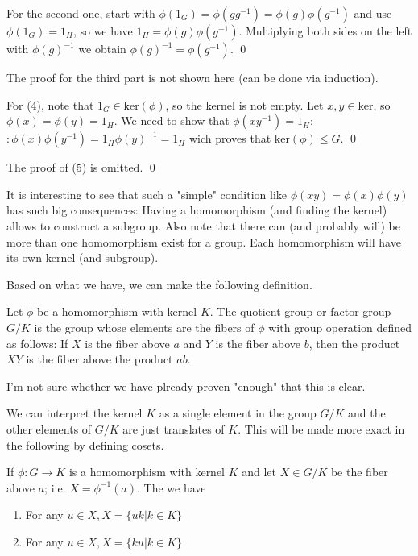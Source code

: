 For the second one, start with $\phi(1_G) = \phi(gg^{-1}) = \phi(g) \phi(g^{-1})$ and use $\phi(1_G) = 1_H$, so we have $1_H = \phi(g) \phi(g^{-1})$. Multiplying both sides on the left with $\phi(g)^{-1}$ we obtain $\phi(g)^{-1} = \phi(g^{-1})$. \qed

The proof for the third part is not shown here (can be done via induction).

For (4), note that $1_G \in \text{ker}(\phi)$, so the kernel is not empty. Let $x,y \in \text{ker}$, so $\phi(x) = \phi(y) = 1_H$. We need to show that $\phi(xy^{-1}) = 1_H$: $:\phi(x)\phi(y^{-1}) = 1_H \phi(y)^{-1} = 1_H$ wich proves that $\text{ker}(\phi) \leq G$. \qed

The proof of (5) is omitted. \qed

It is interesting to see that such a "simple" condition like $\phi(x y) = \phi(x) \phi(y)$ has such big consequences: Having a homomorphism (and finding the kernel) allows to construct a subgroup. Also note that there can (and probably will) be more than one homomorphism exist for a group. Each homomorphism will have its own kernel (and subgroup).

Based on what we have, we can make the following definition. 

\begin{definition}
Let $\phi$ be a homomorphism with kernel $K$. The quotient group or factor group $G/K$ is the group whose elements are the fibers of $\phi$ with group operation defined as follows: If $X$ is the fiber above $a$ and $Y$ is the fiber above $b$, then the product $XY$ is the fiber above the product $ab$.
\end{definition}

I'm not sure whether we have plready proven "enough" that this is clear.

We can interpret the kernel $K$ as a single element in the group $G/K$ and the other elements of $G/K$ are just translates of $K$. This will be made more exact in the following by defining cosets.


If $\phi: G \rightarrow K$ is a homomorphism with kernel $K$ and let $X \in G/K$ be the fiber above $a$; i.e. $X = \phi^{-1}(a)$. The we have
\begin{enumerate}
	\item For any $u \in X, X = \{uk | k \in K\}$

	\item For any $u \in X, X = \{ku | k \in K\}$
\end{enumerate}

